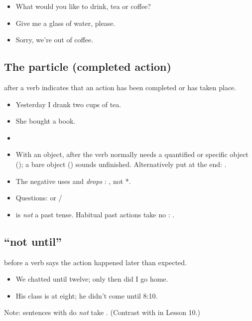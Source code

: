 \begin{itemize}
  \item {} What would you like to drink, tea or coffee?
  \item {} Give me a glass of water, please.
  \item {} Sorry, we're out of coffee.
\end{itemize}

\subsection{The particle  (completed action)}

 after a verb indicates that an action has been completed or has taken place.

\begin{itemize}
  \item {} Yesterday I drank two cups of tea.
  \item {} She bought a book.
  \item {}
\end{itemize}

\begin{important}
\begin{itemize}
  \item With an object,  after the verb normally needs a quantified or specific
        object (); a bare object () sounds unfinished.
        Alternatively put  at the end: .
  \item The negative uses  and \emph{drops} : , not
        *.
  \item Questions:  or /
  \item {} is \emph{not} a past tense. Habitual past actions take no :
        .
\end{itemize}
\end{important}

\subsection{ ``not until''}

 before a verb says the action happened later than expected.
\begin{itemize}
  \item {} We chatted until twelve; only then did I go
        home.
  \item {} His class is at eight; he didn't come until
        8:10.
\end{itemize}
Note: sentences with  do \emph{not} take . (Contrast with  in Lesson
10.)

